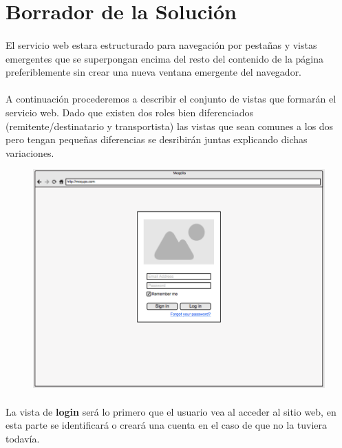 \documentclass[10pt, a4paper,spanish]{article}
\begin{document}
		\section{Borrador de la Solución}

			\paragraph{}
			El servicio web estara estructurado para navegación por pestañas y vistas emergentes que se superpongan encima del resto del contenido de la página preferiblemente sin crear una nueva ventana emergente del navegador.

			\paragraph{}
			A continuación procederemos a describir el conjunto de vistas que formarán el servicio web. Dado que existen dos roles bien diferenciados (remitente/destinatario y transportista) las vistas que sean comunes a los dos pero tengan pequeñas diferencias se desribirán juntas explicando dichas variaciones.

			\begin{figure}[H]
				\centering
				\begin{minipage}[b]{0.7\textwidth}
					\includegraphics[width=\textwidth]{res/sketch_login.png}
				\end{minipage}
			\end{figure}

			\paragraph{}
			La vista de \textbf{login} será lo primero que el usuario vea al acceder al sitio web, en esta parte se identificará o creará una cuenta en el caso de que no la tuviera todavía.
\end{document}
